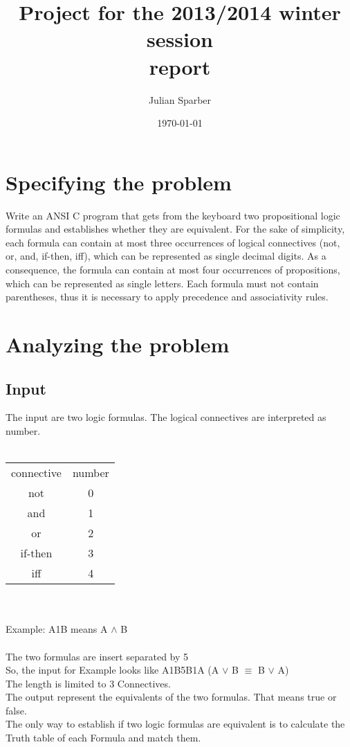 \documentclass[11pt, a4paper, titlepage, block]{article}
\title{\textbf{Project for the 2013/2014 winter session\\ report}}
\author{Julian Sparber}
\date{\today}
\begin{document}
\maketitle
\section{Specifying the problem}
	Write an ANSI C program that gets from the keyboard two propositional logic formulas and
	establishes whether they are equivalent. For the sake of simplicity, each formula can contain at
	most three occurrences of logical connectives (not, or, and, if-then, iff), which can be represented
	as single decimal digits. As a consequence, the formula can contain at most four occurrences of
	propositions, which can be represented as single letters. Each formula must not contain parentheses,
	thus it is necessary to apply precedence and associativity rules.
	\newpage
\section{Analyzing the problem}
	\subsection{Input}
	The input are two logic formulas. The logical connectives are interpreted as number. \\
	\\
	\begin{tabular}{cc}
	connective & number\\
		not & 0\\
		and & 1\\
		or & 2\\
		if-then & 3\\
		iff & 4\\
	\end{tabular}\\
	\\
	Example: A1B means A $\wedge $ B\\
	\\ 
	The two formulas are insert separated by 5\\
	So, the input for Example looks like A1B5B1A (A $\vee $ B $\equiv $ B $\vee $ A)\\
	The length is limited to 3 Connectives.\\
	The output represent the equivalents of the two formulas. That means true or false.\\
	The only way to establish if two logic formulas are equivalent is to calculate the Truth table of each Formula and match them.
	
\end{document}

